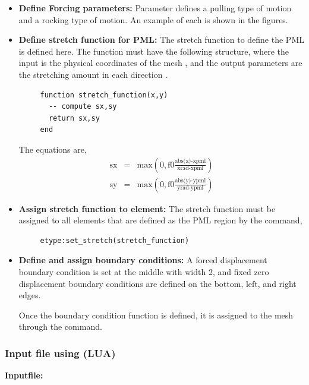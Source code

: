 \begin{itemize}

  \item{\textbf{Define Forcing parameters:}}
  Parameter  defines a pulling type of motion and 
   a rocking type of motion. An example of 
  each is shown in the figures.

  \item{\textbf{Define stretch function for PML:}}
  The stretch function to define the PML is defined here.
  The function must have the following structure, where
  the input is the physical coordinates of the mesh , 
  and the output parameters are the stretching amount
  in each direction .
  \begin{verbatim}
     function stretch_function(x,y)
       -- compute sx,sy
       return sx,sy
     end
  \end{verbatim}
  The equations are,
  \begin{eqnarray}
  \text{sx}
        &=& \text{max}\left(0, \text{f0} \frac{\text{abs(x)-xpml}}{\text{xrad-xpml}}\right) \nonumber \\
  \text{sy}
        &=& \text{max}\left(0, \text{f0} \frac{\text{abs(y)-ypml}}{\text{yrad-ypml}}\right) \nonumber 
  \end{eqnarray}

  \item{\textbf{Assign stretch function to element:}}
  The stretch function must be assigned to all elements that
  are defined as the PML region by the command,
  \begin{verbatim}
     etype:set_stretch(stretch_function)
  \end{verbatim}

  \item{\textbf{Define and assign boundary conditions:}}  
  A forced displacement boundary condition is set at the middle with
  width 2, and fixed zero displacement boundary conditions are 
  defined on the bottom, left, and right edges.

  Once the boundary condition function is defined, it is assigned 
  to the mesh through the  command.

\end{itemize}

\clearpage
\subsubsection*{Input file using (LUA)}
\begin{flushleft}
  \textbf{Inputfile:}
  \\
\end{flushleft}
\hspace{1in}
{\footnotesize
{}
}

